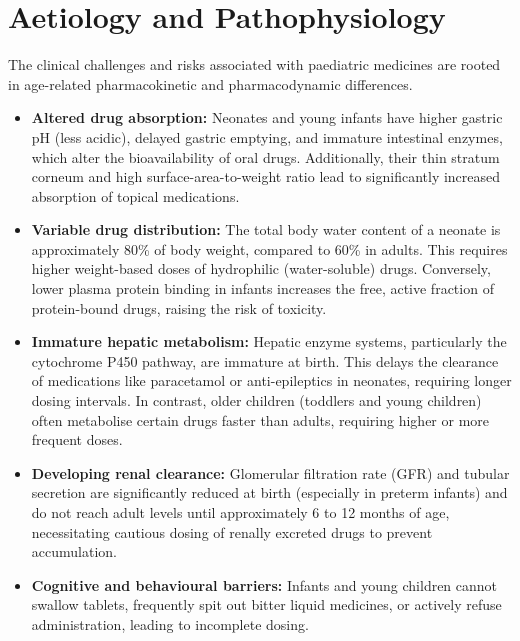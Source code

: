 \section*{Aetiology and Pathophysiology}
The clinical challenges and risks associated with paediatric medicines are rooted in age-related pharmacokinetic and pharmacodynamic differences.
\begin{itemize}
    \item \textbf{Altered drug absorption:} Neonates and young infants have higher gastric pH (less acidic), delayed gastric emptying, and immature intestinal enzymes, which alter the bioavailability of oral drugs. Additionally, their thin stratum corneum and high surface-area-to-weight ratio lead to significantly increased absorption of topical medications.
    \item \textbf{Variable drug distribution:} The total body water content of a neonate is approximately 80\% of body weight, compared to 60\% in adults. This requires higher weight-based doses of hydrophilic (water-soluble) drugs. Conversely, lower plasma protein binding in infants increases the free, active fraction of protein-bound drugs, raising the risk of toxicity.
    \item \textbf{Immature hepatic metabolism:} Hepatic enzyme systems, particularly the cytochrome P450 pathway, are immature at birth. This delays the clearance of medications like paracetamol or anti-epileptics in neonates, requiring longer dosing intervals. In contrast, older children (toddlers and young children) often metabolise certain drugs faster than adults, requiring higher or more frequent doses.
    \item \textbf{Developing renal clearance:} Glomerular filtration rate (GFR) and tubular secretion are significantly reduced at birth (especially in preterm infants) and do not reach adult levels until approximately 6 to 12 months of age, necessitating cautious dosing of renally excreted drugs to prevent accumulation.
    \item \textbf{Cognitive and behavioural barriers:} Infants and young children cannot swallow tablets, frequently spit out bitter liquid medicines, or actively refuse administration, leading to incomplete dosing.
\end{itemize}

